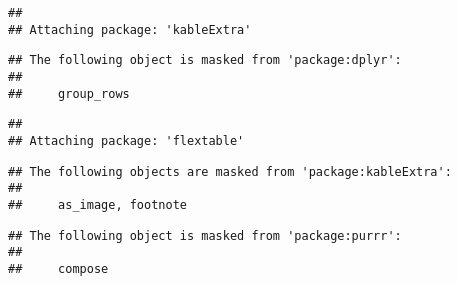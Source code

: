 \documentclass[
]{article}
\begin{document}
\begin{verbatim}
## 
## Attaching package: 'kableExtra'
\end{verbatim}

\begin{verbatim}
## The following object is masked from 'package:dplyr':
## 
##     group_rows
\end{verbatim}

\begin{verbatim}
## 
## Attaching package: 'flextable'
\end{verbatim}

\begin{verbatim}
## The following objects are masked from 'package:kableExtra':
## 
##     as_image, footnote
\end{verbatim}

\begin{verbatim}
## The following object is masked from 'package:purrr':
## 
##     compose
\end{verbatim}

\providecommand{\docline}[3]{\noalign{\global\setlength{\arrayrulewidth}{#1}}\arrayrulecolor[HTML]{#2}\cline{#3}}

\setlength{\tabcolsep}{2pt}

\renewcommand*{\arraystretch}{1.5}
\end{document}
